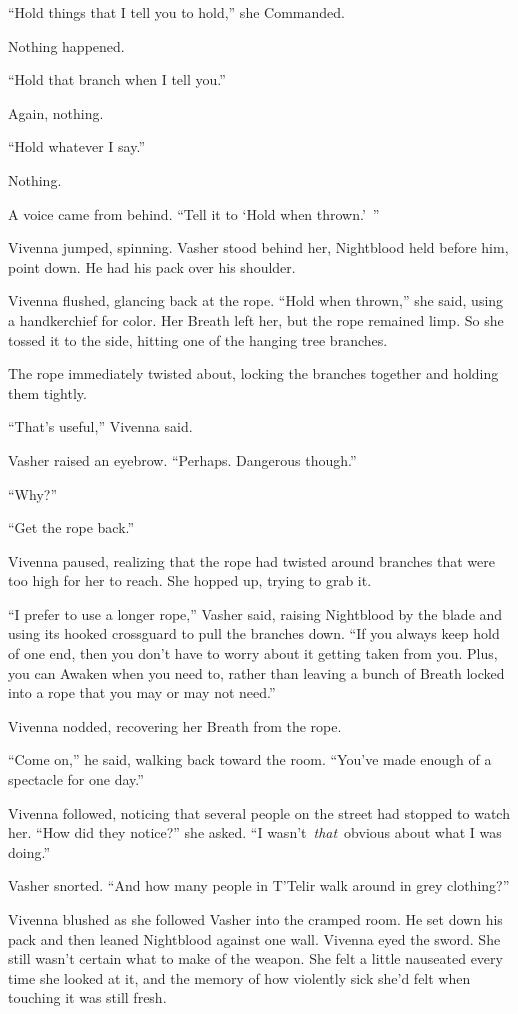 “Hold things that I tell you to hold,” she Commanded.

Nothing happened.

“Hold that branch when I tell you.”

Again, nothing.

“Hold whatever I say.”

Nothing.

A voice came from behind. “Tell it to ‘Hold when thrown.’~”

Vivenna jumped, spinning. Vasher stood behind her, Nightblood held before him, point down. He had his pack over his shoulder.

Vivenna flushed, glancing back at the rope. “Hold when thrown,” she said, using a handkerchief for color. Her Breath left her, but the rope remained limp. So she tossed it to the side, hitting one of the hanging tree branches.

The rope immediately twisted about, locking the branches together and holding them tightly.

“That’s useful,” Vivenna said.

Vasher raised an eyebrow. “Perhaps. Dangerous though.”

“Why?”

“Get the rope back.”

Vivenna paused, realizing that the rope had twisted around branches that were too high for her to reach. She hopped up, trying to grab it.

“I prefer to use a longer rope,” Vasher said, raising Nightblood by the blade and using its hooked crossguard to pull the branches down. “If you always keep hold of one end, then you don’t have to worry about it getting taken from you. Plus, you can Awaken when you need to, rather than leaving a bunch of Breath locked into a rope that you may or may not need.”

Vivenna nodded, recovering her Breath from the rope.

“Come on,” he said, walking back toward the room. “You’ve made enough of a spectacle for one day.”

Vivenna followed, noticing that several people on the street had stopped to watch her. “How did they notice?” she asked. “I wasn’t~\textit{that}~obvious about what I was doing.”

Vasher snorted. “And how many people in T’Telir walk around in grey clothing?”

Vivenna blushed as she followed Vasher into the cramped room. He set down his pack and then leaned Nightblood against one wall. Vivenna eyed the sword. She still wasn’t certain what to make of the weapon. She felt a little nauseated every time she looked at it, and the memory of how violently sick she’d felt when touching it was still fresh.

